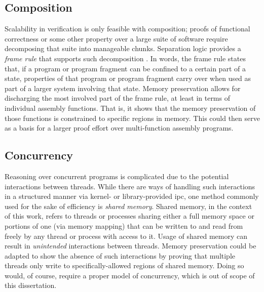 \subsection{Composition}\label{sse:composition}
Scalability in verification is only feasible with composition;
proofs of functional correctness or some other property over a large suite of software
require decomposing that suite into manageable chunks.
Separation logic provides a \emph{frame rule} that supports such%
decomposition \autocite{o2001local,reynolds2002separation,krebbers2017essence}.
In words, the frame rule states that,
if a program or program fragment can be confined to a certain part of a state,
properties of that program or program fragment carry over
when used as part of a larger system involving that state.
Memory preservation allows for discharging the most involved part of the frame rule,
at least in terms of individual assembly functions.
That is, it shows that the memory preservation of those functions is constrained
to specific regions in memory.
This could then serve as a basis
for a larger proof effort over multi-function assembly programs.

\subsection{Concurrency}
Reasoning over concurrent programs is complicated
due to the potential interactions between threads.
While there are ways of handling such interactions in a structured manner
via kernel- or library-provided \ac{ipc},
one method commonly used for the sake of efficiency is \emph{shared memory}.
Shared memory, in the context of this work,
refers to threads or processes sharing either a full memory space
or portions of one (via memory mapping)
that can be written to and read from freely by any thread or process with access to it.
Usage of shared memory can result in \emph{unintended} interactions between threads.
Memory preservation could be adapted to show the absence of such interactions
by proving that multiple threads only write
to specifically-allowed regions of shared memory.
Doing so would, of course, require a proper model of concurrency,
which is out of scope of this dissertation.

